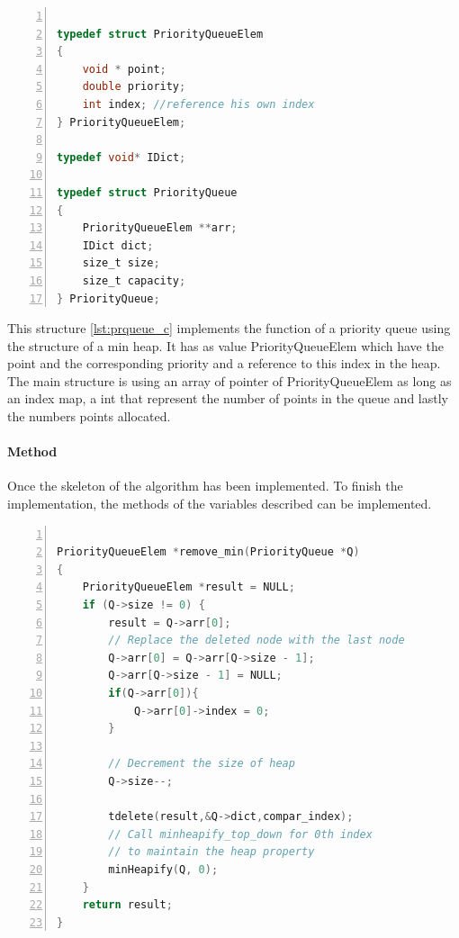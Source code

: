 \begin{minipage}{\linewidth}
\begin{lstlisting}[language=C, % Spécifie le langage du code
caption={PriorityQueue}, % Légende du listing
label=lst:prqueue_c, % Étiquette pour référencer le listing
numbers=left,
numberstyle=\tiny\color{gray},
stepnumber=1,
frame=single,
breaklines=true,
postbreak=\mbox{\textcolor{red}{$\hookrightarrow$}\space},
showstringspaces=false
]

typedef struct PriorityQueueElem
{
	void * point;
	double priority;
	int index; //reference his own index
} PriorityQueueElem;

typedef void* IDict;

typedef struct PriorityQueue
{
	PriorityQueueElem **arr;
	IDict dict;
	size_t size;
	size_t capacity;
} PriorityQueue;

\end{lstlisting} 
\end{minipage}

This structure \ref{lst:prqueue_c} implements the function of a priority queue using the structure of a min heap. It has as value PriorityQueueElem which have the point and the corresponding priority and a reference to this index in the heap. The main structure is using an array of pointer of PriorityQueueElem as long as an index map, a int that represent the number of points in the queue and lastly the numbers points allocated.

\paragraph{Method}

Once the skeleton of the algorithm has been implemented. To finish the implementation, the methods of the variables described can be implemented. 

\begin{minipage}{\linewidth}
\begin{lstlisting}[language=C, % Spécifie le langage du code
	caption={PriorityQueue Remove Min}, % Légende du listing
	label=lst:prqueueMethodR_c, % Étiquette pour référencer le listing
	numbers=left,
	numberstyle=\tiny\color{gray},
	stepnumber=1,
	frame=single,
	breaklines=true,
	postbreak=\mbox{\textcolor{red}{$\hookrightarrow$}\space},
	showstringspaces=false
]
	
PriorityQueueElem *remove_min(PriorityQueue *Q)
{
	PriorityQueueElem *result = NULL;
	if (Q->size != 0) {
		result = Q->arr[0];
		// Replace the deleted node with the last node
		Q->arr[0] = Q->arr[Q->size - 1];
		Q->arr[Q->size - 1] = NULL;
		if(Q->arr[0]){
			Q->arr[0]->index = 0;
		}
		
		// Decrement the size of heap
		Q->size--;
		
		tdelete(result,&Q->dict,compar_index);
		// Call minheapify_top_down for 0th index
		// to maintain the heap property
		minHeapify(Q, 0);
	}
	return result;
}
\end{lstlisting}
\end{minipage}

